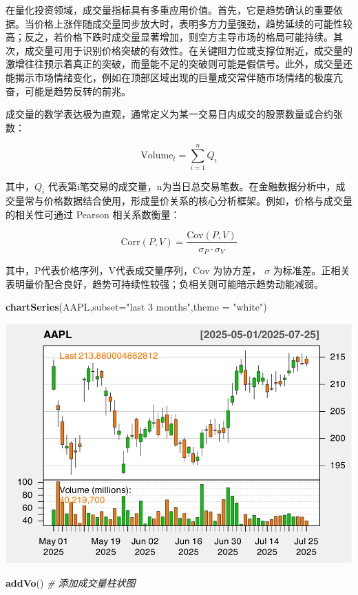 \documentclass[]{ctexbook}
\newenvironment{Shaded}{\begin{snugshade}}{\end{snugshade}}
\newcommand{\AttributeTok}[1]{\textcolor[rgb]{0.13,0.29,0.53}{#1}}
\newcommand{\CommentTok}[1]{\textcolor[rgb]{0.56,0.35,0.01}{\textit{#1}}}
\newcommand{\FunctionTok}[1]{\textcolor[rgb]{0.13,0.29,0.53}{\textbf{#1}}}
\newcommand{\NormalTok}[1]{#1}
\newcommand{\StringTok}[1]{\textcolor[rgb]{0.31,0.60,0.02}{#1}}
\begin{document}
在量化投资领域，成交量指标具有多重应用价值。首先，它是趋势确认的重要依据。当价格上涨伴随成交量同步放大时，表明多方力量强劲，趋势延续的可能性较高；反之，若价格下跌时成交量显著增加，则空方主导市场的格局可能持续。其次，成交量可用于识别价格突破的有效性。在关键阻力位或支撑位附近，成交量的激增往往预示着真正的突破，而量能不足的突破则可能是假信号。此外，成交量还能揭示市场情绪变化，例如在顶部区域出现的巨量成交常伴随市场情绪的极度亢奋，可能是趋势反转的前兆。

成交量的数学表达极为直观，通常定义为某一交易日内成交的股票数量或合约张数：

\[\text{Volume}_t = \sum_{i=1}^{n}Q_i\]

其中，\(Q_i\) 代表第i笔交易的成交量，n为当日总交易笔数。在金融数据分析中，成交量常与价格数据结合使用，形成量价关系的核心分析框架。例如，价格与成交量的相关性可通过 Pearson 相关系数衡量：

\[\text{Corr}(P, V) = \frac{\text{Cov}(P, V)}{\sigma_P \cdot \sigma_V}\]

其中，P代表价格序列，V代表成交量序列，\(\text{Cov}\) 为协方差， \(\sigma\) 为标准差。正相关表明量价配合良好，趋势可持续性较强；负相关则可能暗示趋势动能减弱。

\begin{Shaded}
\begin{Highlighting}[]
\FunctionTok{chartSeries}\NormalTok{(AAPL,}\AttributeTok{subset=}\StringTok{"last 3 months"}\NormalTok{,}\AttributeTok{theme =} \StringTok{"white"}\NormalTok{)}
\end{Highlighting}
\end{Shaded}

\includegraphics[width=0.9\linewidth]{QuantmodHandbook_files/figure-latex/vo-1}

\begin{Shaded}
\begin{Highlighting}[]
\FunctionTok{addVo}\NormalTok{()  }\CommentTok{\# 添加成交量柱状图}
\end{Highlighting}
\end{Shaded}
\end{document}
